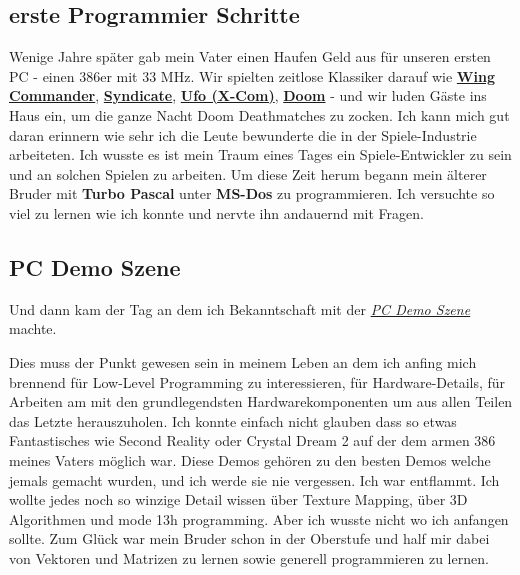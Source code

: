 \subsection*{erste Programmier Schritte}

Wenige Jahre später gab mein Vater einen Haufen Geld aus für unseren ersten PC - einen 386er mit 33 MHz. Wir spielten zeitlose Klassiker darauf wie \href{https://de.wikipedia.org/wiki/Wing_Commander_(Computerspiel)}{\textbf{Wing Commander}}, \href{https://de.wikipedia.org/wiki/Syndicate}{\textbf{Syndicate}}, \href{https://de.wikipedia.org/wiki/X-COM}{\textbf{Ufo (X-Com)}}, \href{https://de.wikipedia.org/wiki/Doom}{\textbf{Doom}} - und wir luden Gäste ins Haus ein, um die ganze Nacht Doom Deathmatches zu zocken. Ich kann mich gut daran erinnern wie sehr ich die Leute bewunderte die in der Spiele-Industrie arbeiteten. Ich wusste es ist mein Traum eines Tages ein Spiele-Entwickler zu sein und an solchen Spielen zu arbeiten. Um diese Zeit herum begann mein älterer Bruder mit \textbf{Turbo Pascal} unter \textbf{MS-Dos} zu programmieren. Ich versuchte so viel zu lernen wie ich konnte und nervte ihn andauernd mit Fragen.

\subsection*{PC Demo Szene}

Und dann kam der Tag an dem ich Bekanntschaft mit der \href{https://de.wikipedia.org/wiki/Demoszene}{\textit{PC Demo Szene}} machte.

Dies muss der Punkt gewesen sein in meinem Leben an dem ich anfing mich brennend für Low-Level Programming zu interessieren, für Hardware-Details, für Arbeiten am mit den grundlegendsten Hardwarekomponenten um aus allen Teilen das Letzte herauszuholen. Ich konnte einfach nicht glauben dass so etwas Fantastisches wie Second Reality oder Crystal Dream 2 auf der dem armen 386 meines Vaters möglich war. Diese Demos gehören zu den besten Demos welche jemals gemacht wurden, und ich werde sie nie vergessen. Ich war entflammt. Ich wollte jedes noch so winzige Detail wissen über Texture Mapping, über 3D Algorithmen und mode 13h programming. Aber ich wusste nicht wo ich anfangen sollte. Zum Glück war mein Bruder schon in der Oberstufe und half mir dabei von Vektoren und Matrizen zu lernen sowie generell  programmieren zu lernen.

